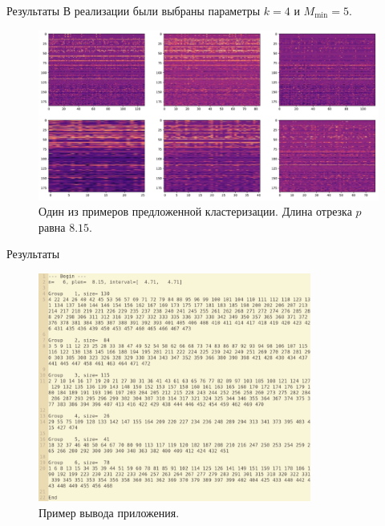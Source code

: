\documentclass{beamer}
\begin{document}
\begin{frame}{Результаты}
  В реализации были выбраны параметры $k=4$ и $M_{\min}=5$.

  \begin{figure}
    \includegraphics[width=1.0\textwidth]{./figures/result.pdf}

    \caption{Один из примеров предложенной кластеризации. Длина отрезка $p$
      равна $8.15$.}
  \end{figure}
\end{frame}

\begin{frame}{Результаты}
  \begin{figure}
    \includegraphics[width=0.8\textwidth]{./figures/screenshot.png}

    \caption{Пример вывода приложения.}
  \end{figure}
\end{frame}
\end{document}
